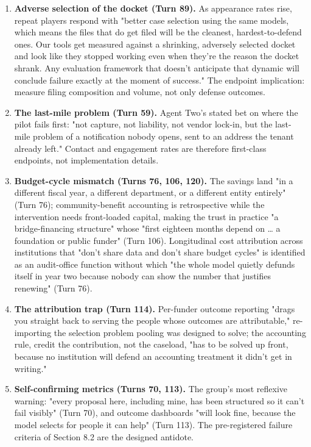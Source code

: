\documentclass[sigconf,nonacm=true]{acmart}
\begin{document}
\begin{enumerate}[nosep]
\item \textbf{Adverse selection of the docket (Turn 89).} As appearance rates rise, repeat players respond with "better case selection using the same models, which means the files that do get filed will be the cleanest, hardest-to-defend ones. Our tools get measured against a shrinking, adversely selected docket and look like they stopped working even when they're the reason the docket shrank. Any evaluation framework that doesn't anticipate that dynamic will conclude failure exactly at the moment of success." The endpoint implication: measure filing composition and volume, not only defense outcomes.
\item \textbf{The last-mile problem (Turn 59).} Agent Two's stated bet on where the pilot fails first: "not capture, not liability, not vendor lock-in, but the last-mile problem of a notification nobody opens, sent to an address the tenant already left." Contact and engagement rates are therefore first-class endpoints, not implementation details.
\item \textbf{Budget-cycle mismatch (Turns 76, 106, 120).} The savings land "in a different fiscal year, a different department, or a different entity entirely" (Turn 76); community-benefit accounting is retrospective while the intervention needs front-loaded capital, making the trust in practice "a bridge-financing structure" whose "first eighteen months depend on … a foundation or public funder" (Turn 106). Longitudinal cost attribution across institutions that "don't share data and don't share budget cycles" is identified as an audit-office function without which "the whole model quietly defunds itself in year two because nobody can show the number that justifies renewing" (Turn 76).
\item \textbf{The attribution trap (Turn 114).} Per-funder outcome reporting "drags you straight back to serving the people whose outcomes are attributable," re-importing the selection problem pooling was designed to solve; the accounting rule,  credit the contribution, not the caseload,  "has to be solved up front, because no institution will defend an accounting treatment it didn't get in writing."
\item \textbf{Self-confirming metrics (Turns 70, 113).} The group's most reflexive warning: "every proposal here, including mine, has been structured so it can't fail visibly" (Turn 70), and outcome dashboards "will look fine, because the model selects for people it can help" (Turn 113). The pre-registered failure criteria of Section 8.2 are the designed antidote.

\end{enumerate}
\end{document}
